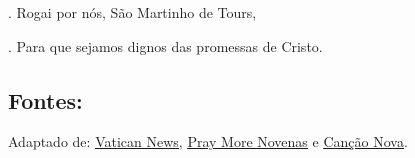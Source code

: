 \documentclass[a4paper,14pt,twoside]{extarticle} \usepackage[utf8]{inputenc}
\makeatletter
\newcommand{\vers@resp@sym}{%
  \raisebox{0.2ex}{\rotatebox[origin=c]{-20}{$\m@th\rceil$}}%
}
\newcommand{\vers@resp}[2]{%
  {\ooalign{%
     \hidewidth\kern#1\vers@resp@sym\hidewidth\cr
     #2\cr
  }}%
}
\DeclareRobustCommand{\versicle}{\vers@resp{-0.1em}{\textbf{V}}}
\DeclareRobustCommand{\response}{\vers@resp{0pt}{\textbf{R}}}
\makeatother
\begin{document}
\versicle. Rogai por nós, São Martinho de Tours,

\response. Para que sejamos dignos das promessas de Cristo.

\vfill

\begin{center}
\subsection*{Fontes:}
Adaptado de: 
 \underline{\href{https://www.vaticannews.va/pt/santo-do-dia/11/11/s--martinho--bispo-de-tours-.html}{Vatican News}}, \underline{\href{https://www.praymorenovenas.com/st-martin-of-tours-novena}{Pray More Novenas}} e \underline{\href{https://santo.cancaonova.com/santo/sao-martinho-de-tours-o-dono-do-manto-que-cobriu-jesus/}{Canção Nova}}.
\end{center}
\end{document}
